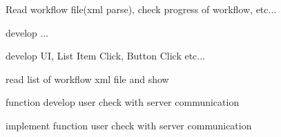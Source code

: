 
\begin{DoxyRefList}
\item[\label{todo__todo000001}%
\hypertarget{todo__todo000001}{}%
클래스 \hyperlink{classkookmin_1_1cs_1_1homeflow_1_1_dashboard_activity}{kookmin.cs.homeflow.Dashboard\+Activity} ]Read workflow file(xml parse), check progress of workflow, etc...  
\item[\label{todo__todo000002}%
\hypertarget{todo__todo000002}{}%
클래스 \hyperlink{classkookmin_1_1cs_1_1homeflow_1_1_device_list_activity}{kookmin.cs.homeflow.Device\+List\+Activity} ]develop ...  
\item[\label{todo__todo000003}%
\hypertarget{todo__todo000003}{}%
클래스 \hyperlink{classkookmin_1_1cs_1_1homeflow_1_1_flow_list_activity}{kookmin.cs.homeflow.Flow\+List\+Activity} ]develop U\+I, List Item Click, Button Click etc...  
\item[\label{todo__todo000004}%
\hypertarget{todo__todo000004}{}%
멤버 \hyperlink{classkookmin_1_1cs_1_1homeflow_1_1_flow_list_activity_a8e7f4c315f0498cbb846022ddd0df21e}{kookmin.cs.homeflow.Flow\+List\+Activity.on\+Create} (Bundle saved\+Instance\+State)]read list of workflow xml file and show  
\item[\label{todo__todo000005}%
\hypertarget{todo__todo000005}{}%
클래스 \hyperlink{classkookmin_1_1cs_1_1homeflow_1_1_login_activity}{kookmin.cs.homeflow.Login\+Activity} ]function develop user check with server communication  
\item[\label{todo__todo000006}%
\hypertarget{todo__todo000006}{}%
멤버 \hyperlink{classkookmin_1_1cs_1_1homeflow_1_1_login_activity_a29cfa7fedc97be0ec337678df698100f}{kookmin.cs.homeflow.Login\+Activity.on\+Click} (View v)]implement function user check with server communication 
\end{DoxyRefList}